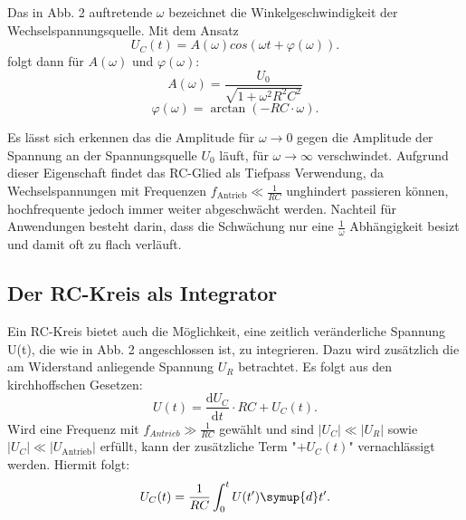 Das in Abb. 2 auftretende $\omega$ bezeichnet die Winkelgeschwindigkeit der Wechselspannungsquelle.
  Mit dem Ansatz
  \begin{equation}
  U_C(t) = A(\omega)cos(\omega t+\varphi(\omega))\text{.}
  \end{equation}
  folgt dann für $A(\omega)$ und $\varphi(\omega)$:
  \begin{equation}
    A(\omega) = \frac{U_0}{\sqrt{1+\omega^2R^2C^2}}
  \end{equation}
  \begin{equation}
    \varphi(\omega) = \arctan(-RC \cdot \omega)\text{.}
  \end{equation}

Es lässt sich erkennen das die Amplitude für $\omega \to 0$ gegen die Amplitude der Spannung an der Spannungsquelle $U_0$ läuft, für
$\omega \to \infty$ verschwindet. Aufgrund dieser Eigenschaft findet das RC-Glied als
 Tiefpass Verwendung, da Wechselspannungen mit Frequenzen $f_{\text{Antrieb}} \ll \frac{1}{RC}$
  unghindert passieren können, hochfrequente jedoch immer weiter abgeschwächt werden.
  Nachteil für Anwendungen besteht darin, dass die Schwächung nur eine $\frac{1}{\omega}$ Abhängigkeit besizt und damit oft zu flach verläuft.

\subsection{Der RC-Kreis als Integrator}

Ein RC-Kreis bietet auch die Möglichkeit, eine zeitlich veränderliche Spannung U(t), die
wie in Abb. 2 angeschlossen ist, zu integrieren. Dazu wird zusätzlich die am Widerstand anliegende Spannung $U_R$ betrachtet. Es folgt aus den kirchhoffschen Gesetzen:
\begin{equation}
  U(t) = \frac{\text{d}U_C}{\text{d}t}\cdot RC+U_C(t)\text{.}
\end{equation}
Wird eine Frequenz mit $f_{Antrieb} \gg \frac{1}{RC}$ gewählt und sind
$|U_C| \ll |U_R|$ sowie $|U_C| \ll |U_{\text{Antrieb}}|$ erfüllt, kann der zusätzliche Term "$+ U_C(t)$"
 vernachlässigt werden. Hiermit folgt:
\begin{equation}
U_C(t) = \frac{1}{RC}\int_{0}^{t} U(t') \symup{d}t'\text{.}
\end{equation}
